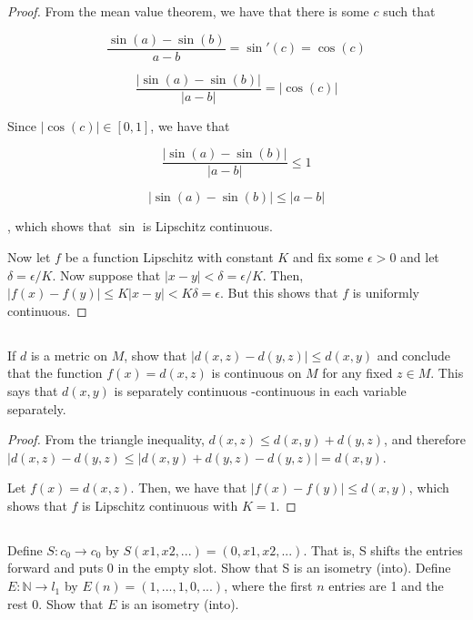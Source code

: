 \begin{proof}
From the mean value theorem, we have that there is some $c$ such that

$$ \frac{\sin(a)-\sin(b)}{a-b} = \sin'(c) = \cos(c)$$

$$ \frac{|\sin(a)-\sin(b)|}{|a-b|} = |\cos(c)| $$

Since $|\cos(c)| \in [0,1]$, we have that

$$ \frac{|\sin(a)-\sin(b)|}{|a-b|} \leq 1 $$

$$ |\sin(a)-\sin(b)| \leq |a-b| $$

, which shows that $\sin$ is Lipschitz continuous.

\vspace{1em}

Now let $f$ be a function Lipschitz with constant $K$ and fix some $\epsilon > 0$ and let $\delta = \epsilon/K$. Now suppose that $|x-y| < \delta = \epsilon/K$. Then, $|f(x)-f(y)| \leq K|x-y| < K \delta = \epsilon$. But this shows that $f$ is uniformly continuous.

\end{proof}

\subsection{} If $d$ is a metric on $M$, show  that $|d(x, z) -d(y, z)| \leq d(x , y)$ and conclude that the function $f(x) = d(x, z)$ is continuous on $M$ for any fixed $z \in M$. This says that $d(x, y)$ is separately continuous -continuous in each variable separately. 

\begin{proof}

From the triangle inequality, $d(x, z) \leq d(x,y) + d(y,z)$, and therefore $|d(x,z) - d(y,z) \leq |d(x,y) + d(y,z) - d(y,z)| = d(x,y)$.

Let $f(x) = d(x,z)$. Then, we have that $|f(x) - f(y)| \leq d(x,y)$, which shows that $f$ is Lipschitz continuous with $K=1$.

\end{proof}




\subsection{} Define $S : c_0 \rightarrow c_0$ by $S(x1, x2, ... ) = (0, x1, x2, ... )$. That is, S shifts the entries forward and puts 0 in the empty slot. Show that S is an isometry (into). Define $E : \mathbb{N} \rightarrow l_1$ by $E(n) = (1, ... ,  1, 0, ... )$, where the first $n$ entries are 1 and the rest 0. Show  that $E$ is an isometry (into).

